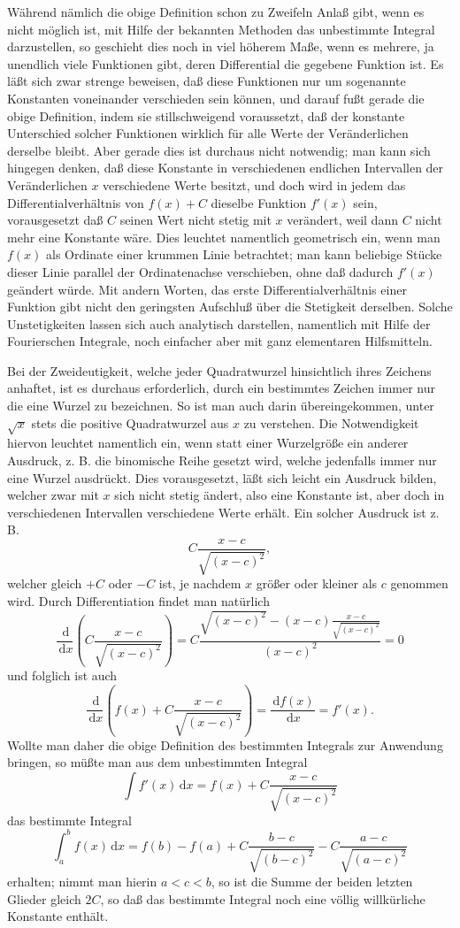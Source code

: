 \documentclass[11pt]{article}
\newcommand{\dd}{\,\mathrm d}
\begin{document}
Während nämlich die obige Definition schon zu Zweifeln Anlaß gibt, wenn es nicht möglich ist, mit Hilfe der bekannten Methoden das unbestimmte Integral darzustellen, so geschieht dies noch in viel höherem Maße, wenn es mehrere, ja unendlich viele Funktionen gibt, deren Differential die gegebene Funktion ist. Es läßt sich zwar strenge beweisen, daß diese Funktionen nur um sogenannte Konstanten voneinander verschieden sein können, und darauf fußt gerade die obige Definition, indem sie stillschweigend voraussetzt, daß der konstante Unterschied solcher Funktionen wirklich für alle Werte der Veränderlichen derselbe bleibt. Aber gerade dies ist durchaus nicht notwendig; man kann sich hingegen denken, daß diese Konstante in verschiedenen endlichen Intervallen der Veränderlichen $x$ verschiedene Werte besitzt, und doch wird in jedem das Differentialverhältnis von $f(x)+C$ dieselbe Funktion $f'(x)$ sein, vorausgesetzt daß $C$ seinen Wert nicht stetig mit $x$ verändert, weil dann $C$ nicht mehr eine Konstante wäre. Dies leuchtet namentlich geometrisch ein, wenn man $f(x)$ als Ordinate einer krummen Linie betrachtet; man kann beliebige Stücke dieser Linie parallel der Ordinatenachse verschieben, ohne daß dadurch $f'(x)$ geändert würde. Mit andern Worten, das erste Differentialverhältnis einer Funktion gibt nicht den geringsten Aufschluß über die Stetigkeit derselben. Solche Unstetigkeiten lassen sich auch analytisch darstellen, namentlich mit Hilfe der Fourierschen Integrale, noch einfacher aber mit ganz elementaren Hilfsmitteln.

Bei der Zweideutigkeit, welche jeder Quadratwurzel hinsichtlich ihres Zeichens anhaftet, ist es durchaus erforderlich, durch ein bestimmtes Zeichen immer nur die eine Wurzel zu bezeichnen. So ist man auch darin übereingekommen, unter $\sqrt{x}$ stets die positive Quadratwurzel aus $x$ zu verstehen. Die Notwendigkeit hiervon leuchtet namentlich ein, wenn statt einer Wurzelgröße ein anderer Ausdruck, z. B. die binomische Reihe gesetzt wird, welche jedenfalls immer nur eine Wurzel ausdrückt. Dies vorausgesetzt, läßt sich leicht ein Ausdruck bilden, welcher zwar mit $x$ sich nicht stetig ändert, also eine Konstante ist, aber doch in verschiedenen Intervallen verschiedene Werte erhält. Ein solcher Ausdruck ist z. B.
\[
C\frac{x-c}{\sqrt{(x-c)^2}},
\]
welcher gleich $+C$ oder $-C$ ist, je nachdem $x$ größer oder kleiner als $c$ genommen wird. Durch Differentiation findet man natürlich
\[
\frac{\dd}{\dd x}\left(C\frac{x-c}{\sqrt{(x-c)^2}}\right)
=C\frac{\sqrt{(x-c)^2}-(x-c)\frac{x-c}{\sqrt{(x-c)^2}}}{(x-c)^2}=0
\]
und folglich ist auch
\[
\frac{\dd}{\dd x}\left(f(x)+C\frac{x-c}{\sqrt{(x-c)^2}}\right)=\frac{\dd f(x)}{\dd x}=f'(x).
\]
Wollte man daher die obige Definition des bestimmten Integrals zur Anwendung bringen, so müßte man aus dem unbestimmten Integral
\[
\int f'(x)\dd x=f(x)+C\frac{x-c}{\sqrt{(x-c)^2}}
\]
das bestimmte Integral
\[
\int_a^b f(x)\dd x=f(b)-f(a)+C\frac{b-c}{\sqrt{(b-c)^2}}-C\frac{a-c}{\sqrt{(a-c)^2}}
\]
erhalten; nimmt man hierin $a<c<b$, so ist die Summe der beiden letzten Glieder gleich $2C$, so daß das bestimmte Integral noch eine völlig willkürliche Konstante enthält.
\end{document}
